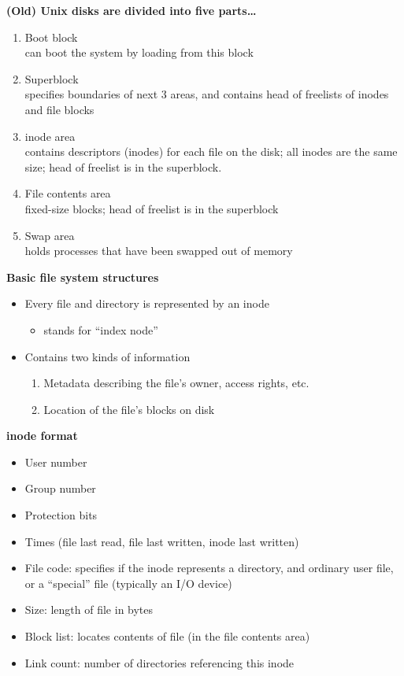 \documentclass[11pt,a4paper]{article}
\begin{document}
\textbf{(Old) Unix disks are divided into five parts\dots}
\begin{enumerate}
    \item Boot block \\
        can boot the system by loading from this block
    \item Superblock \\
        specifies boundaries of next 3 areas, and contains head of freelists of inodes
        and file blocks
    \item inode area \\
        contains descriptors (inodes) for each file on the disk;
        all inodes are the same size;
        head of freelist is in the superblock.
    \item File contents area \\
        fixed-size blocks; head of freelist is in the superblock
    \item Swap area \\
        holds processes that have been swapped out of memory
\end{enumerate}

\textbf{Basic file system structures}
\begin{itemize}
    \item Every file and directory is represented by an inode
        \begin{itemize}
            \item stands for ``index node''
        \end{itemize}
    \item Contains two kinds of information
        \begin{enumerate}
            \item Metadata describing the file's owner, access rights, etc.
            \item Location of the file's blocks on disk
        \end{enumerate}
\end{itemize}

\textbf{inode format}
\begin{itemize}
    \item User number
    \item Group number
    \item Protection bits
    \item Times (file last read, file last written, inode last written)
    \item File code: specifies if the inode represents a directory, and ordinary user file,
        or a ``special'' file (typically an I/O device)
    \item Size: length of file in bytes
    \item Block list: locates contents of file (in the file contents area)
    \item Link count: number of directories referencing this inode
\end{itemize}
\end{document}
